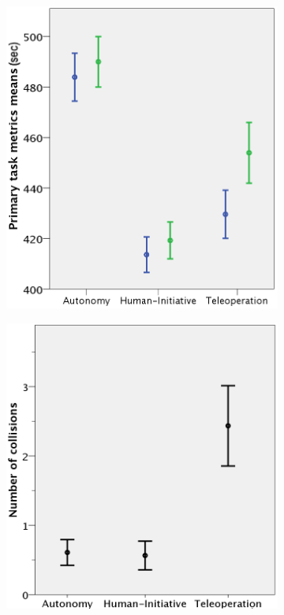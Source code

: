 \documentclass[a4paper,12pt,oneside,openright]{bhamthesis}
\begin{document}
	\begin{figure}
		\centering
		\begin{subfigure}[b]{0.49\textwidth}
			\centering
			\includegraphics[width=\textwidth]{chapter4_fig/primary_metrics_time.png}
			\caption{}
			\label{subfig:totalTime_exp2}
		\end{subfigure}
		\hfill
		\begin{subfigure}[b]{0.49\textwidth}
			\centering
			\includegraphics[width=\textwidth]{chapter4_fig/collisions.png}

\end{subfigure}
\end{figure}
\end{document}
